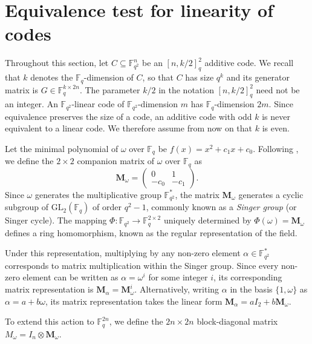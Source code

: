 \documentclass[a4paper,12pt]{article}
\theoremstyle{plain}
\theoremstyle{definition}
\begin{document}
\section{Equivalence test for linearity of codes}


Throughout this section, let $C \subseteq \mathbb{F}_{q^2}^n$ be an $[n, k/2]_q^2$ additive code. 
We recall that $k$ denotes the $\mathbb{F}_q$-dimension of $C$, so that $C$ has size $q^k$ and its generator matrix is $G \in \mathbb{F}_q^{k \times 2n}$.
The parameter $k/2$ in the notation $[n, k/2]_q^2$ need not be an integer. 
An $\mathbb{F}_{q^2}$-linear code of $\mathbb{F}_{q^2}$-dimension $m$ has $\mathbb{F}_q$-dimension $2m$. Since equivalence preserves the size of a code, an additive code with odd $k$ is never equivalent to a linear code. 
We therefore assume from now on that $k$ is even.


Let the minimal polynomial of $\omega$ over $\mathbb{F}_q$ be $f(x)=x^2+c_1x+c_0$. 
Following \cite[Section 13.2]{mullen2013}, we define the $2 \times 2$ companion matrix of $\omega$ over $\mathbb{F}_q$ as
\[ \mathbf{M}_\omega = \begin{pmatrix} 0 & 1 \\ -c_0 & -c_1 \end{pmatrix}. \]
Since $\omega$ generates the multiplicative group $\mathbb{F}_{q^2}^*$, the matrix $\mathbf{M}_\omega$ generates a cyclic subgroup of $\textrm{GL}_2(\mathbb{F}_q)$ of order $q^2-1$, commonly known as a \textit{Singer group} (or Singer cycle). The mapping $\Phi: \mathbb{F}_{q^2} \to \mathbb{F}_q^{2 \times 2}$ uniquely determined by $\Phi(\omega) = \mathbf{M}_\omega$ defines a ring homomorphism, known as the regular representation of the field. 

Under this representation, multiplying by any non-zero element $\alpha \in \mathbb{F}_{q^2}^*$ corresponds to matrix multiplication within the Singer group. Since every non-zero element can be written as $\alpha = \omega^i$ for some integer $i$, its corresponding matrix representation is $\mathbf{M}_\alpha = \mathbf{M}_\omega^i$. Alternatively, writing $\alpha$ in the basis $\{1, \omega\}$ as $\alpha = a + b\omega$, its matrix representation takes the linear form $\mathbf{M}_\alpha = aI_2 + b\mathbf{M}_\omega$.

To extend this action to $\mathbb{F}_q^{2n}$, we define the $2n \times 2n$ block-diagonal matrix $M_\omega = I_n \otimes \mathbf{M}_\omega$.
\end{document}
